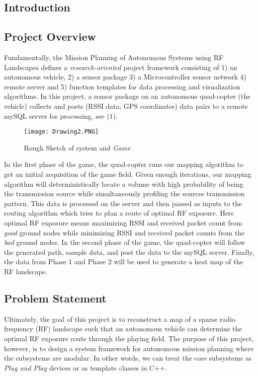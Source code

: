 \documentclass[11pt,letterpaper,titlepage]{article}
\begin{document}
\begin{onehalfspace}
\section{Introduction}
\subsection{Project Overview}
\noindent
Fundamentally, the Mission Planning of Autonomous Systems using RF Landscapes defines a \textit{research-oriented} project framework consisting of 1) an autonomous vehicle, 2) a sensor package 3) a Microcontroller sensor network 4) remote server and 5) function templates for data processing and visualization algorithms. In this project, a sensor package on an autonomous quad-copter (the vehicle) collects and posts (RSSI data, GPS coordinates) data pairs to a remote mySQL server for processing, see (1).\\ 

\begin{wrapfigure}{r}{0.6\textwidth}
\label{fig:systemSketch}
\centering
\texttt{[image: Drawing2.PNG]}
\caption{Rough Sketch of system and \textit{Game}}
\end{wrapfigure}

\noindent
In the first phase of the game, the quad-copter runs our mapping algorithm to get an initial acquisition of the game field. Given enough iterations, our mapping algorithm will deterministically locate a volume with high probability of being the transmission source while simultaneously profiling the sources transmission pattern. This data is processed on the server and then passed as inputs to the routing algorithm which tries to plan a route of optimal RF exposure. Here optimal RF exposure means maximizing RSSI and received packet count from \textit{good} ground nodes while minimizing RSSI and received packet counts from the \textit{bad} ground nodes. In the second phase of the game, the quad-copter will follow the generated path, sample data, and post the data to the mySQL server. Finally, the data from Phase 1 and Phase 2 will be used to generate a heat map of the RF landscape.  



\subsection{Problem Statement}
Ultimately, the goal of this project is to reconstruct a map of a sparse radio frequency (RF) landscape such that an autonomous vehicle can determine the optimal RF exposure route through the playing field. The purpose of this project, however, is to design a system framework for autonomous mission planning where the subsystems are modular. In other words, we can treat the core subsystems as \textit{Plug and Play} devices or as template classes in C++. 


\end{onehalfspace}
\end{document}
